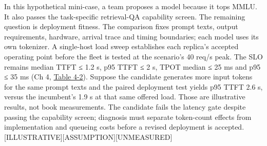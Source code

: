 In this hypothetical mini-case, a team proposes a model because it tops
MMLU. It also passes the task-specific retrieval-QA capability screen.
The remaining question is deployment fitness. The comparison fixes
prompt texts, output requirements, hardware, arrival trace and timing
boundaries; each model uses its own tokenizer. A single-host load sweep
establishes each replica's accepted operating point before the fleet is
tested at the scenario's 40 req/s peak. The SLO remains median TTFT ≤
1.2 s, p95 TTFT ≤ 2 s, TPOT median ≤ 25 ms and p95 ≤ 35 ms (Ch 4, \hyperref[tab:4.2]{Table 4-2}). Suppose the candidate generates more input tokens for the same
prompt texts and the paired deployment test yields p95 TTFT 2.6 s,
versus the incumbent's 1.9 s at that same offered load. Those are
illustrative results, not book measurements. The candidate fails the
latency gate despite passing the capability screen; diagnosis must
separate token-count effects from implementation and queueing costs
before a revised deployment is accepted.
\mbox{{[}ILLUSTRATIVE{]}}\hspace{0pt}\mbox{{[}ASSUMPTION{]}}\hspace{0pt}\mbox{{[}UNMEASURED{]}}
